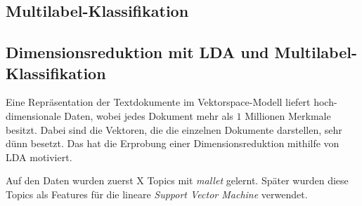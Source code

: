 
\subsection{Multilabel-Klassifikation}

\subsection{Dimensionsreduktion mit LDA und Multilabel-Klassifikation}

Eine Repräsentation der Textdokumente im Vektorspace-Modell liefert hoch-dimensionale Daten, wobei jedes Dokument mehr als $1$ Millionen Merkmale besitzt.
Dabei sind die Vektoren, die die einzelnen Dokumente darstellen, sehr dünn besetzt.
Das hat die Erprobung einer Dimensionsreduktion mithilfe von LDA motiviert.

Auf den Daten wurden zuerst X Topics mit \emph{mallet} \cite{McCallumMALLET} gelernt.
Später wurden diese Topics als Features für die lineare \emph{Support Vector Machine} verwendet.





